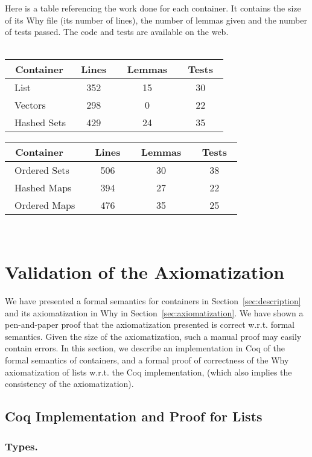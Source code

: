\documentclass[runningheads,a4paper]{llncs}
\newcommand{\wrt}{w.r.t.\xspace}
\newcommand{\beforesec}{\vspace{-0.2cm}}
\newcommand{\aftersec}{\vspace{-0.2cm}}
\newcommand{\beforesub}{\vspace{-0.2cm}}
\newcommand{\aftersub}{\vspace{-0.1cm}}
\begin{document}
Here is a table referencing the work done for each container. It contains the
size of its Why file (its number of lines), the number of lemmas given and the
number of tests passed. The code and tests are available
on the web.\\
~\\
\begin{tabular}{|l|c|c|c||}
\hline
~Container & ~Lines~ & ~Lemmas~ & ~Tests~ \\
\hline
~List & 352 & 15 & 30 \\
\hline
~Vectors & 298 & 0 & 22 \\
\hline
~Hashed Sets & 429 & 24 & 35 \\
\hline
\end{tabular}\begin{tabular}{|l|c|c|c|}
\hline
~Container & ~Lines~ & ~Lemmas~ & ~Tests~ \\
\hline
~Ordered Sets & 506 & 30 & 38 \\
\hline
~Hashed Maps & 394 & 27 & 22 \\
\hline
~Ordered Maps~ & 476 & 35 & 25 \\
\hline
\end{tabular}\\

\beforesec
\section{Validation of the Axiomatization}
\label{sec:validation}
\aftersec

We have presented a formal semantics for containers in
Section~\ref{sec:description} and its axiomatization in Why in
Section~\ref{sec:axiomatization}. We have shown a pen-and-paper proof that the
axiomatization presented is correct \wrt formal semantics. Given the size of
the axiomatization, such a manual proof may easily contain errors. In this
section, we describe an implementation in Coq of the formal semantics of
containers, and a formal proof of correctness of the Why axiomatization of
lists \wrt the Coq implementation, (which also implies
the consistency of the axiomatization).

\beforesub
\subsection{Coq Implementation and Proof for Lists}
\aftersub

\subsubsection{Types.}
\end{document}
